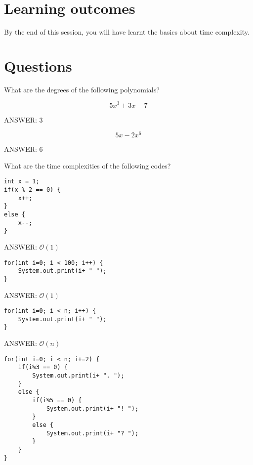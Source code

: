 
\section* {Learning outcomes}

By the end of this session, you will have learnt the basics about time complexity.

\section*{Questions}
\begin{questions}

\question What are the degrees of the following polynomials?

\begin{equation}
5x^3 + 3x - 7
\end{equation}

\ifprintanswers
ANSWER: 3
\else
\fi

\begin{equation}
5x - 2x^6
\end{equation}

\ifprintanswers
ANSWER: 6
\else
\fi

\question What are the time complexities of the following codes?

\begin{lstlisting}
int x = 1;
if(x % 2 == 0) {
	x++;
}
else {
	x--;
}
\end{lstlisting}

\ifprintanswers
ANSWER: $\mathcal{O}(1)$
\else
\fi

\begin{lstlisting}
for(int i=0; i < 100; i++) {
	System.out.print(i+ " ");
}
\end{lstlisting}

\ifprintanswers
ANSWER: $\mathcal{O}(1)$
\else
\fi


\begin{lstlisting}
for(int i=0; i < n; i++) {
	System.out.print(i+ " ");
}
\end{lstlisting}

\ifprintanswers
ANSWER: $\mathcal{O}(n)$
\else
\fi

\begin{lstlisting}
for(int i=0; i < n; i+=2) {
	if(i%3 == 0) {
		System.out.print(i+ ". ");
	}
	else {
		if(i%5 == 0) {
			System.out.print(i+ "! ");
		}
		else {
			System.out.print(i+ "? ");
		}
	}
}
\end{lstlisting}


\end{questions}
